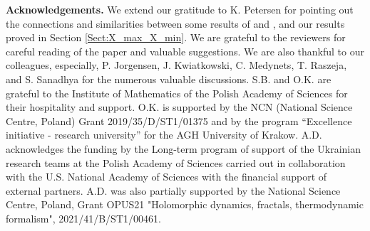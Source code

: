 \documentclass[11pt, twoside]{amsart}
\theoremstyle{definition}
\theoremstyle{remark}
\theoremstyle{plain}
\numberwithin{equation}{section}
\begin{document}
\medskip
\textbf{Acknowledgements.} We extend our gratitude to K. Petersen for pointing out the connections and similarities between some results of \cite{Fricketal2017} and \cite{FrickPetersenShields}, and our results proved in Section \ref{Sect:X_max_X_min}. We are grateful to the reviewers for careful reading of the paper and valuable suggestions.
We are also thankful to our colleagues, 
especially, P. Jorgensen, J. Kwiatkowski, C. Medynets, T. Raszeja, and S. Sanadhya for the numerous valuable discussions.
S.B. and O.K. are grateful to the Institute of Mathematics of the Polish Academy of Sciences for their hospitality and support. 
O.K. is supported by the NCN (National Science Centre, Poland) Grant 2019/35/D/ST1/01375 and by the program ``Excellence initiative - research university'' for the AGH University of Krakow. A.D. acknowledges the funding by the Long-term program of support of the Ukrainian research teams at the Polish Academy of Sciences carried out in collaboration with the U.S. National Academy of Sciences with the financial support of external partners. A.D. was also partially supported by the National Science Centre, Poland, Grant OPUS21 "Holomorphic dynamics, fractals, thermodynamic formalism", 2021/41/B/ST1/00461.



\end{document}
